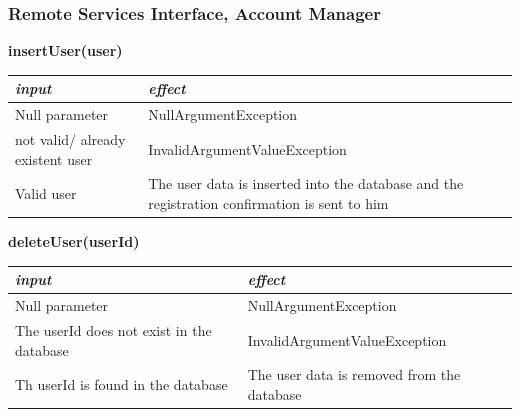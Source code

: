 \documentclass{article}
\begin{document}
\begin{flushleft}
      
      
      
      
      
      
      
      
      
      
      
      
      
      
      
      
      
      
      
      
      \subsubsection{Remote Services Interface, Account Manager } %
      
   \begin{center}
   \begin{flushleft}
    \textbf{insertUser(user)}
    \end{flushleft}
        \begin{tabular}{  |  p{6cm} | p{6cm} |}
    \hline
    \textit{input} &  \textit{effect} \\
    \hline
    
    Null parameter & NullArgumentException
     \\ 
  \hline
   not valid/ already existent user & InvalidArgumentValueException  \\
  \hline
  Valid user & The user data is inserted  into the database and the registration confirmation is sent to him    \\
  \hline
    \end{tabular}
\end{center}


  \begin{center}
   \begin {flushleft}
    \textbf{deleteUser(userId)}
    \end{flushleft}
        \begin{tabular}{  |  p{6cm} | p{6cm} |}
    \hline
    \textit{input} &  \textit{effect} \\
    \hline
    
    Null parameter & NullArgumentException
     \\ 
  \hline
  The userId does not exist in the database & InvalidArgumentValueException  \\
  \hline
  Th userId is found in the database & The user data is removed from the database
   \\
  \hline
    \end{tabular}
\end{center}
      

\end{flushleft}
\end{document}
